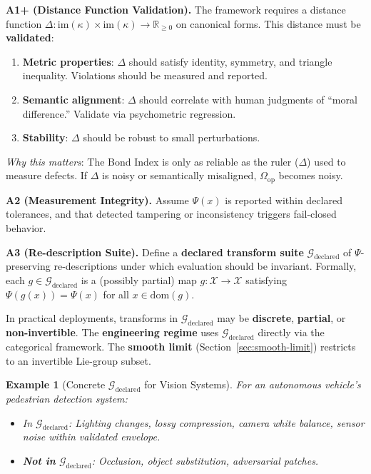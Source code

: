 \documentclass[12pt]{article}
\newtheorem{example}[theorem]{Example}
\begin{document}
\textbf{A1+ (Distance Function Validation).} The framework requires a distance function $\Delta\colon \mathrm{im}(\kappa) \times \mathrm{im}(\kappa) \to \mathbb{R}_{\geq 0}$ on canonical forms. This distance must be \textbf{validated}:
\begin{enumerate}
    \item \textbf{Metric properties}: $\Delta$ should satisfy identity, symmetry, and triangle inequality. Violations should be measured and reported.
    \item \textbf{Semantic alignment}: $\Delta$ should correlate with human judgments of ``moral difference.'' Validate via psychometric regression.
    \item \textbf{Stability}: $\Delta$ should be robust to small perturbations.
\end{enumerate}

\emph{Why this matters}: The Bond Index is only as reliable as the ruler ($\Delta$) used to measure defects. If $\Delta$ is noisy or semantically misaligned, $\Omega_{\mathrm{op}}$ becomes noisy.

\textbf{A2 (Measurement Integrity).} Assume $\Psi(x)$ is reported within declared tolerances, and that detected tampering or inconsistency triggers fail-closed behavior.

\textbf{A3 (Re-description Suite).} Define a \textbf{declared transform suite} $\mathcal{G}_{\mathrm{declared}}$ of $\Psi$-preserving re-descriptions under which evaluation should be invariant. Formally, each $g \in \mathcal{G}_{\mathrm{declared}}$ is a (possibly partial) map $g\colon \mathcal{X} \to \mathcal{X}$ satisfying $\Psi(g(x)) = \Psi(x)$ for all $x \in \mathrm{dom}(g)$.

In practical deployments, transforms in $\mathcal{G}_{\mathrm{declared}}$ may be \textbf{discrete}, \textbf{partial}, or \textbf{non-invertible}. The \textbf{engineering regime} uses $\mathcal{G}_{\mathrm{declared}}$ directly via the categorical framework. The \textbf{smooth limit} (Section~\ref{sec:smooth-limit}) restricts to an invertible Lie-group subset.

\begin{example}[Concrete $\mathcal{G}_{\mathrm{declared}}$ for Vision Systems]
\emph{For an autonomous vehicle's pedestrian detection system:}
\begin{itemize}
    \item \emph{In} $\mathcal{G}_{\mathrm{declared}}$\emph{: Lighting changes, lossy compression, camera white balance, sensor noise within validated envelope.}
    \item \textbf{\emph{Not in}} $\mathcal{G}_{\mathrm{declared}}$\emph{: Occlusion, object substitution, adversarial patches.}
\end{itemize}
\end{example}
\end{document}
